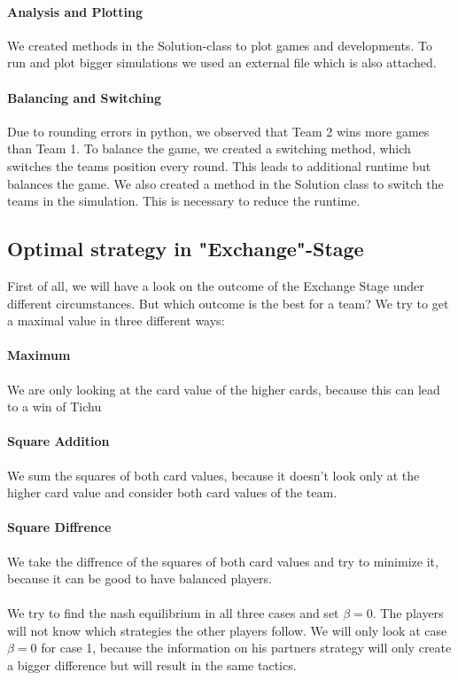\paragraph{Analysis and Plotting}
We created methods in the Solution-class to plot games and developments. To run and plot bigger simulations we used an external file which is also attached. 

\paragraph{Balancing and Switching}
Due to rounding errors in python, we observed that Team 2 wins more games than Team 1. 
To balance the game, we created a switching method, which switches the teams position every round. This leads to additional runtime but balances the game. 
We also created a method in the Solution class to switch the teams in the simulation. This is necessary to reduce the runtime. 

\subsection{Optimal strategy in "Exchange"-Stage}

First of all, we will have a look on the outcome of the Exchange Stage under different circumstances. But which outcome is the best for a team? We try to get a maximal value in three different ways:

\paragraph{Maximum}  We are only looking at the card value of the higher cards, because this can lead to a win of Tichu
\paragraph{Square Addition}  We sum the squares of both card values, because it doesn’t look only at the higher card value and consider both card values of the team.
\paragraph{Square Diffrence} We take the diffrence of the squares of both card values and try to minimize it, because it can be good to have balanced players. 
\\
\\
We try to find the nash equilibrium in all three cases and set $\beta = 0$. The players will not know which strategies the other players follow. We will only look at case $\beta = 0$ for case 1, because the information on his partners strategy will only create a bigger difference but will result in the same tactics. 

